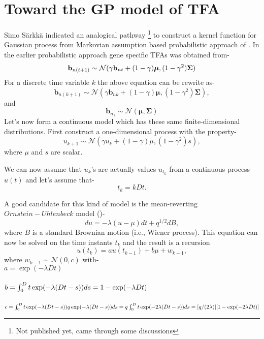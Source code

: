 \section{Toward the GP model of TFA}
Simo S\"arkk\"a indicated an analogical pathway \footnote{Not published yet, came through some discussions}
to construct a kernel function for Gaussian process from
Markovian assumption based probabilistic approach of \cite{Sanguinetti:2006}.
In the earlier probabilistic approach gene specific TFAs was obtained from-
\begin{equation} \label{eq:tfa_SanG_updateCh4}
  \bold{b}_{n(t+1)} \sim \mathcal{N} (\gamma \bold{b}_{nt} + (1-\gamma)\boldsymbol{\mu},(1-\gamma^2)\bold{\Sigma})
\end{equation}
For a discrete time variable $k$ the above equation can be rewrite as-
\begin{equation}
\textbf{b}_{n(k+1)} \sim \mathcal{N}\left(\gamma \textbf{b}_{nk} + (1 - \gamma) \boldsymbol{\mu}, (1 - \gamma^2) \boldsymbol{\Sigma}\right),
\end{equation}
and
\begin{equation}
\textbf{b}_{n_1} \sim \mathcal{N}\left(\boldsymbol{\mu}, \boldsymbol{\Sigma}\right)
\end{equation}
Let's now form a continuous model which has these same finite-dimensional distributions. 
First construct a one-dimensional process with the property-
\begin{equation}
u_{k+1} \sim \mathcal{N}\left(\gamma u_k + \left(1 - \gamma\right) \mu, (1 - \gamma^2)s \right),
\end{equation}
where $\mu$ and $s$ are scalar.

We can now assume that $u_k$'s are actually values $u_{t_k}$ from a continuous process $u(t)$ and  
let's assume that- 
\begin{equation}
t_k = kDt.
\end{equation}

A good candidate for this kind of model is the mean-reverting $Ornstein-Uhlenbeck$ model 
(\cite{Ornstein_Uhlenbeck:1930})-
\begin{equation}
du = -\lambda \left(u - \mu\right) dt + q^{1/2} dB,
\end{equation}
where $B$ is a standard Brownian motion (i.e., Wiener process). 
This equation can now be solved on the time instants $t_k$ and the result is a recursion
\begin{equation}
u(t_k) = a u(t_{k-1}) + b \mu + w_{k-1},
\end{equation}
where $w_{k-1} \sim \mathcal{N}(0,c)$ with-\\
$a = \exp(-\lambda Dt)$\\~\\
$b = \int_0^Dt \exp(-\lambda (Dt-s)) ds\\
 = 1 - \exp(-\lambda Dt)$\\~\\
$c = \int_0^Dt \exp(-\lambda (Dt-s)) q \exp(-\lambda (Dt-s)) ds \\
= q \int_0^Dt \exp(-2 \lambda (Dt-s)) ds\\
= [q / (2 \lambda)] [1 - \exp(-2 \lambda Dt)]$

